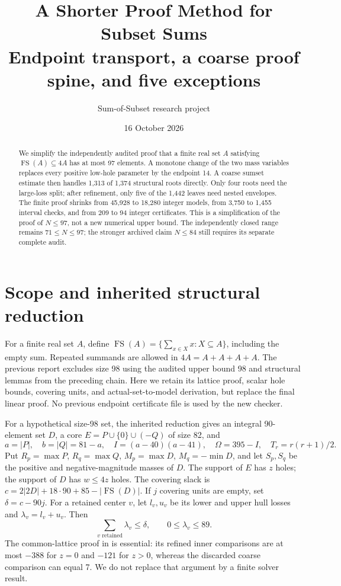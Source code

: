 \documentclass[11pt,a4paper]{article}
\title{A Shorter Proof Method for Subset Sums\\\large Endpoint transport, a coarse proof spine, and five exceptions}
\author{Sum-of-Subset research project}
\date{16 October 2026}
\newcommand{\FS}{\operatorname{FS}}
\begin{document}
\maketitle
\begin{abstract}
We simplify the independently audited proof that a finite real set
$A$ satisfying $\FS(A)\subseteq4A$ has at most 97 elements.
A monotone change of the two mass variables replaces every positive
low-hole parameter by the endpoint 14. A coarse sumset estimate then
handles 1,313 of 1,374 structural roots directly. Only four roots need
the large-loss split; after refinement, only five of the 1,442 leaves
need nested envelopes. The finite proof shrinks from 45,928 to 18,280
integer models, from 3,750 to 1,455 interval checks, and from 209 to 94
integer certificates. This is a simplification of the proof of $N\le97$,
not a new numerical upper bound. The independently closed range remains
$71\le N\le97$; the stronger archived claim $N\le84$ still requires its
separate complete audit.
\end{abstract}

\section{Scope and inherited structural reduction}
For a finite real set $A$, define
$\FS(A)=\{\sum_{x\in X}x:X\subseteq A\}$, including the empty sum.
Repeated summands are allowed in $4A=A+A+A+A$.
The previous report \cite{previous} excludes size 98 using the audited
upper bound 98 and structural lemmas from the preceding chain.
Here we retain its lattice proof, scalar hole bounds, covering units,
and actual-set-to-model derivation, but replace the final linear proof.
No previous endpoint certificate file is used by the new checker.

For a hypothetical size-98 set, the inherited reduction gives an integral
90-element set $D$, a core $E=P\cup\{0\}\cup(-Q)$ of size 82, and
\[
 a=|P|,\quad b=|Q|=81-a,\quad I=(a-40)(a-41),\quad
 \Omega=395-I,\quad T_r=r(r+1)/2.
\]
Put $R_p=\max P$, $R_q=\max Q$, $M_p=\max D$, $M_q=-\min D$,
and let $S_p,S_q$ be the positive and negative-magnitude masses of $D$.
The support of $E$ has $z$ holes; the support of $D$ has $w\le4z$ holes.
The covering slack is
$c=2|2D|+18\cdot90+85-|\FS(D)|$.
If $j$ covering units are empty, set $\delta=c-90j$.
For a retained center $v$, let $l_v,u_v$ be its lower and upper hull
losses and $\lambda_v=l_v+u_v$. Then
\begin{equation}\label{eq:loss}
 \sum_{v\text{ retained}}\lambda_v\le\delta,\qquad0\le\lambda_v\le89.
\end{equation}
The common-lattice proof in \cite{previous} is essential: its refined
inner comparisons are at most $-388$ for $z=0$ and $-121$ for $z>0$,
whereas the discarded coarse comparison can equal 7.
We do not replace that argument by a finite solver result.
\end{document}
